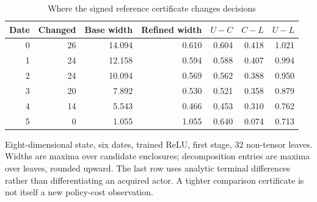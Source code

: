 \begin{table}[htbp]
\centering
\caption{Where the signed reference certificate changes decisions}\label{tab:mechanism56}
{\small\setlength{\tabcolsep}{4pt}
\begin{tabular}{rrrrrrr}
\toprule
Date & Changed & Base width & Refined width & $U-C$ & $C-L$ & $U-L$ \\
\midrule
0 & 26 & 14.094 & 0.610 & 0.604 & 0.418 & 1.021 \\
1 & 24 & 12.158 & 0.594 & 0.588 & 0.407 & 0.994 \\
2 & 24 & 10.094 & 0.569 & 0.562 & 0.388 & 0.950 \\
3 & 20 & 7.892 & 0.530 & 0.521 & 0.358 & 0.879 \\
4 & 14 & 5.543 & 0.466 & 0.453 & 0.310 & 0.762 \\
5 & 0 & 1.055 & 1.055 & 0.640 & 0.074 & 0.713 \\
\bottomrule
\end{tabular}}
\par\smallskip
{\footnotesize Eight-dimensional state, six dates, trained ReLU, first stage, 32 non-tensor leaves. Widths are maxima over candidate enclosures; decomposition entries are maxima over leaves, rounded upward. The last row uses analytic terminal differences rather than differentiating an acquired actor. A tighter comparison certificate is not itself a new policy-cost observation.}
\end{table}
